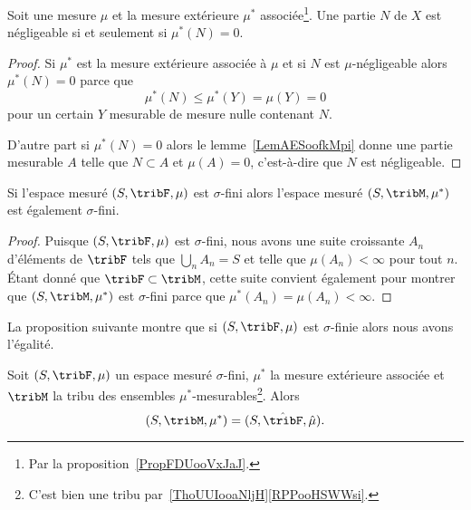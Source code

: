 \begin{corollary}\label{LemXOUNooUbtpxm}
    Soit une mesure \( \mu\) et la mesure extérieure \( \mu^*\) associée\footnote{Par la proposition~\ref{PropFDUooVxJaJ}.}. Une partie \( N\) de \( X\) est négligeable si et seulement si \( \mu^*(N)=0\).
\end{corollary}

\begin{proof}
Si \( \mu^*\) est la mesure extérieure associée à \( \mu\) et si \( N\) est \( \mu\)-négligeable alors \( \mu^*(N)=0\) parce que
\begin{equation}
    \mu^*(N)\leq \mu^*(Y)=\mu(Y)=0
\end{equation}
pour un certain \( Y\) mesurable de mesure nulle contenant \( N\).

D'autre part si \( \mu^*(N)=0\) alors le lemme~\ref{LemAESoofkMpi} donne une partie mesurable \( A\) telle que \( N\subset A\) et \( \mu(A)=0\), c'est-à-dire que \( N\) est négligeable.
\end{proof}

\begin{lemma}       \label{LemOAEoocBDaO}
    Si l'espace mesuré \( (S,\tribF,\mu)\) est \( \sigma\)-fini alors l'espace mesuré \( (S,\tribM,\mu^*)\) est également \( \sigma\)-fini.
\end{lemma}

\begin{proof}
    Puisque \( (S,\tribF,\mu)\) est \( \sigma\)-fini, nous avons une suite croissante \( A_n\) d'éléments de \( \tribF\) tels que \( \bigcup_nA_n=S\) et telle que \( \mu(A_n)<\infty\) pour tout \( n\). Étant donné que \( \tribF\subset\tribM\), cette suite convient également pour montrer que \( (S,\tribM,\mu^*)\) est \( \sigma\)-fini parce que \( \mu^*(A_n)=\mu(A_n)<\infty\).
\end{proof}

La proposition suivante montre que si \( (S,\tribF,\mu)\) est \( \sigma\)-finie alors nous avons l'égalité.
\begin{proposition} \label{PropIIHooAIbfj}
    Soit \( (S,\tribF,\mu)\) un espace mesuré \( \sigma\)-fini, \( \mu^*\) la mesure extérieure associée et \( \tribM\) la tribu des ensembles \( \mu^*\)-mesurables\footnote{C'est bien une tribu par~\ref{ThoUUIooaNljH}\ref{RPPooHSWWsi}.}. Alors
    \begin{equation}
        (S,\tribM,\mu^*) = (S,\hat\tribF,\hat\mu).
    \end{equation}
\end{proposition}

